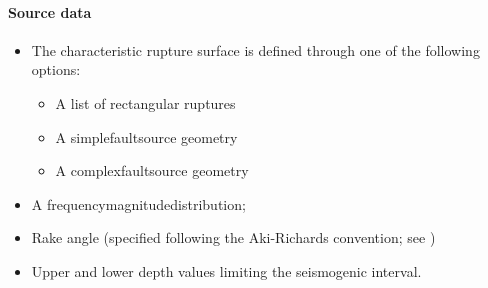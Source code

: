 %
\paragraph{Source data}
%
\begin{itemize}
\item The characteristic rupture surface is defined through one of the 
	following options:
	\begin{itemize}
		\item A list of rectangular ruptures 
		\item A \gls{simplefaultsource} geometry
		\item A \gls{complexfaultsource} geometry
	\end{itemize}
\item A \gls{frequencymagnitudedistribution};
\item Rake angle (specified following the Aki-Richards convention; 
see \citet{aki2002}) 
\item Upper and lower depth values limiting the seismogenic interval.
\end{itemize}
